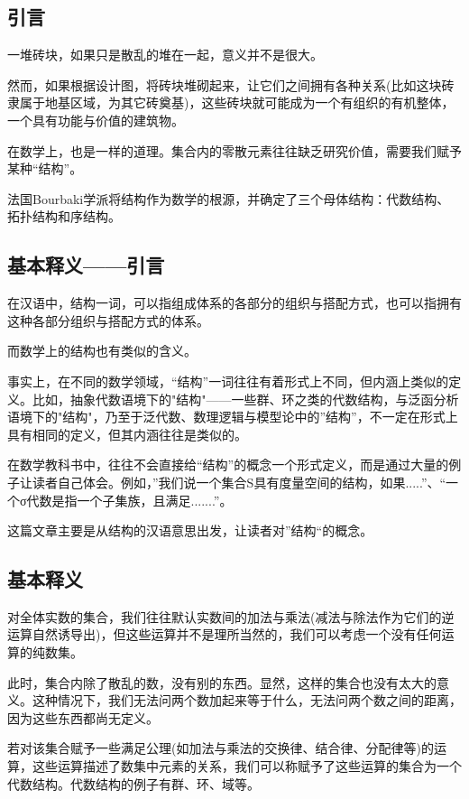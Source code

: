

\subsection{引言}
一堆砖块，如果只是散乱的堆在一起，意义并不是很大。

然而，如果根据设计图，将砖块堆砌起来，让它们之间拥有各种关系(比如这块砖隶属于地基区域，为其它砖奠基)，这些砖块就可能成为一个有组织的有机整体，一个具有功能与价值的建筑物。

在数学上，也是一样的道理。集合内的零散元素往往缺乏研究价值，需要我们赋予某种“结构”。

法国Bourbaki学派将结构作为数学的根源，并确定了三个母体结构：代数结构、拓扑结构和序结构。

\subsection{基本释义——引言}
在汉语中，结构一词，可以指组成体系的各部分的组织与搭配方式，也可以指拥有这种各部分组织与搭配方式的体系。

而数学上的结构也有类似的含义。

事实上，在不同的数学领域，“结构”一词往往有着形式上不同，但内涵上类似的定义。比如，抽象代数语境下的"结构"——一些群、环之类的代数结构，与泛函分析语境下的"结构"，乃至于泛代数、数理逻辑与模型论中的”结构”，不一定在形式上具有相同的定义，但其内涵往往是类似的。

在数学教科书中，往往不会直接给“结构”的概念一个形式定义，而是通过大量的例子让读者自己体会。例如，”我们说一个集合S具有度量空间的结构，如果.....”、“一个σ代数是指一个子集族，且满足.......”。

这篇文章主要是从结构的汉语意思出发，让读者对”结构“的概念。

\subsection{基本释义}

对全体实数的集合，我们往往默认实数间的加法与乘法(减法与除法作为它们的逆运算自然诱导出)，但这些运算并不是理所当然的，我们可以考虑一个没有任何运算的纯数集。

此时，集合内除了散乱的数，没有别的东西。显然，这样的集合也没有太大的意义。这种情况下，我们无法问两个数加起来等于什么，无法问两个数之间的距离，因为这些东西都尚无定义。 

若对该集合赋予一些满足公理(如加法与乘法的交换律、结合律、分配律等)的运算，这些运算描述了数集中元素的关系，我们可以称赋予了这些运算的集合为一个代数结构。代数结构的例子有群、环、域等。

